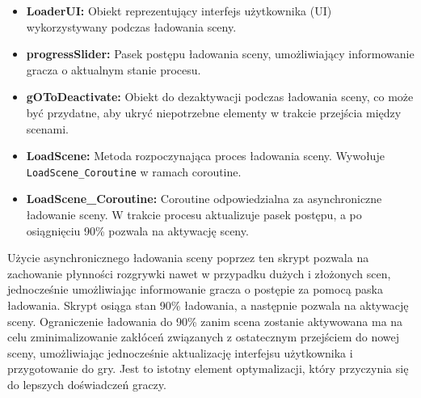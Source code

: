 \begin{itemize}
\item \textbf{LoaderUI:} Obiekt reprezentujący interfejs użytkownika (UI) wykorzystywany podczas ładowania sceny.
\item \textbf{progressSlider:} Pasek postępu ładowania sceny, umożliwiający informowanie gracza o aktualnym stanie procesu.
\item \textbf{gOToDeactivate:} Obiekt do dezaktywacji podczas ładowania sceny, co może być przydatne, aby ukryć niepotrzebne elementy w trakcie przejścia między scenami.
\item \textbf{LoadScene:} Metoda rozpoczynająca proces ładowania sceny. Wywołuje \texttt{LoadScene\_Coroutine} w ramach coroutine.
\item \textbf{LoadScene\_Coroutine:} Coroutine odpowiedzialna za asynchroniczne ładowanie sceny. W trakcie procesu aktualizuje pasek postępu, a po osiągnięciu 90\% pozwala na aktywację sceny.
\end{itemize}
Użycie asynchronicznego ładowania sceny poprzez ten skrypt pozwala na zachowanie płynności rozgrywki nawet w przypadku dużych i złożonych scen, jednocześnie umożliwiając informowanie gracza o postępie za pomocą paska ładowania. Skrypt osiąga stan 90\% ładowania, a następnie pozwala na aktywację sceny. Ograniczenie ładowania do 90\% zanim scena zostanie aktywowana ma na celu zminimalizowanie zakłóceń związanych z ostatecznym przejściem do nowej sceny, umożliwiając jednocześnie aktualizację interfejsu użytkownika i przygotowanie do gry. Jest to istotny element optymalizacji, który przyczynia się do lepszych doświadczeń graczy.

